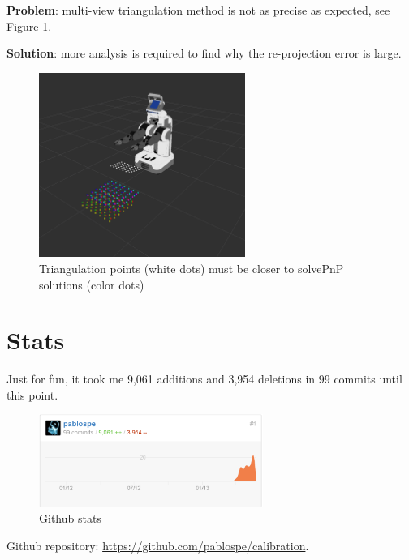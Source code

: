 \textbf{Problem}: multi-view triangulation method is not as precise as expected, see Figure \ref{fig:triangulation_fails}.

\noindent
\textbf{Solution}: more analysis is required to find why the re-projection error is large.

\begin{figure}[!htbp]
 \centering
 \includegraphics[width=0.6\textwidth]{images/screenshots/triangulation_fails.png}
 \caption{Triangulation points (white dots) must be closer to solvePnP solutions (color dots)}
 \label{fig:triangulation_fails}
\end{figure}

\vspace*{-2ex}
\section{Stats}
Just for fun, it took me 9,061 additions and 3,954 deletions in 99 commits until this point.
\begin{figure}[!htbp]
 \centering
 \includegraphics[width=0.65\textwidth]{images/git_stats.png}
 \caption{Github stats}
 \label{fig:git_stats}
\end{figure}

Github repository: \url{https://github.com/pablospe/calibration}.

%
%

